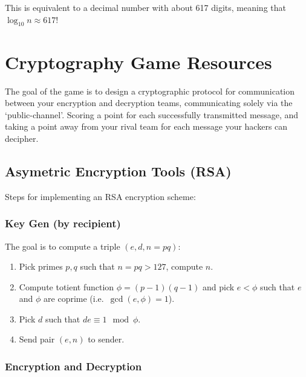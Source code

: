 \documentclass[
  letterpaper,
  DIV=11,
  numbers=noendperiod]{scrreprt}
\providecommand{\tightlist}{%
  \setlength{\itemsep}{0pt}\setlength{\parskip}{0pt}}\usepackage{longtable,booktabs,array}
\begin{document}
This is equivalent to a decimal number with about 617 digits, meaning
that \(\log_{10}n \approx 617\)!


\hypertarget{cryptography-game-resources}{%
\chapter{Cryptography Game
Resources}\label{cryptography-game-resources}}

The goal of the game is to design a cryptographic protocol for
communication between your encryption and decryption teams,
communicating solely via the `public-channel'. Scoring a point for each
successfully transmitted message, and taking a point away from your
rival team for each message your hackers can decipher.

\hypertarget{asymetric-encryption-tools-rsa}{%
\section{Asymetric Encryption Tools
(RSA)}\label{asymetric-encryption-tools-rsa}}

Steps for implementing an RSA encryption scheme:

\hypertarget{key-gen-by-recipient}{%
\subsection{Key Gen (by recipient)}\label{key-gen-by-recipient}}

The goal is to compute a triple \((e, d, n=pq)\):

\begin{enumerate}
\def\labelenumi{\arabic{enumi}.}
\tightlist
\item
  Pick primes \(p, q\) such that \(n=pq > 127\), compute \(n\).
\item
  Compute totient function \(\phi=(p-1)(q-1)\) and pick \(e<\phi\) such
  that \(e\) and \(\phi\) are coprime (i.e.~\(\gcd(e, \phi)=1\)).
\item
  Pick \(d\) such that \(de \equiv 1\mod\phi\).
\item
  Send pair \((e, n)\) to sender.
\end{enumerate}

\hypertarget{encryption-and-decryption}{%
\subsection{Encryption and Decryption}\label{encryption-and-decryption}}
\end{document}
